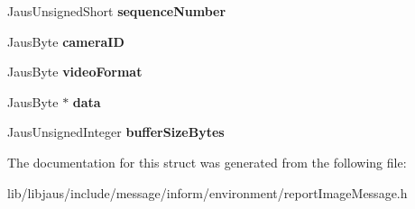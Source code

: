 \begin{DoxyCompactItemize}
\item 
\hypertarget{struct_report_image_message_struct_abefe29679b791f6efe8871d42bcbe2b3}{\-Jaus\-Unsigned\-Short {\bfseries sequence\-Number}}\label{struct_report_image_message_struct_abefe29679b791f6efe8871d42bcbe2b3}

\item 
\hypertarget{struct_report_image_message_struct_a303f2b757b64c15f118dd5fc44aa970a}{\-Jaus\-Byte {\bfseries camera\-I\-D}}\label{struct_report_image_message_struct_a303f2b757b64c15f118dd5fc44aa970a}

\item 
\hypertarget{struct_report_image_message_struct_a68c39f99ec57b5d31941134727e45a25}{\-Jaus\-Byte {\bfseries video\-Format}}\label{struct_report_image_message_struct_a68c39f99ec57b5d31941134727e45a25}

\item 
\hypertarget{struct_report_image_message_struct_acb57907d4ffdfa13bb02e8c90a3a9510}{\-Jaus\-Byte $\ast$ {\bfseries data}}\label{struct_report_image_message_struct_acb57907d4ffdfa13bb02e8c90a3a9510}

\item 
\hypertarget{struct_report_image_message_struct_a118024e71588448f96b7ebc3b962c004}{\-Jaus\-Unsigned\-Integer {\bfseries buffer\-Size\-Bytes}}\label{struct_report_image_message_struct_a118024e71588448f96b7ebc3b962c004}

\end{DoxyCompactItemize}


\-The documentation for this struct was generated from the following file\-:\begin{DoxyCompactItemize}
\item 
lib/libjaus/include/message/inform/environment/report\-Image\-Message.\-h\end{DoxyCompactItemize}
